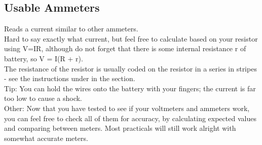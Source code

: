 \subsection{Usable Ammeters}
Reads a current similar to other ammeters. \\
Hard to say exactly what current, 
but feel free to calculate based on your resistor using V=IR, although do not
forget that there is some internal resistance r of battery, so V = I(R + r). \\
The resistance of the resistor is usually coded on the resistor in a series in stripes -
see the instructions under  in the  section.  \\
Tip: You can hold the wires onto the battery with your fingers; the current
is far too low to cause a shock.  \\
Other: Now that you have tested to see if your voltmeters and ammeters
work, you can feel free to check all of them for accuracy, by calculating expected
values and comparing between meters. Most practicals will still work alright
with somewhat accurate meters.